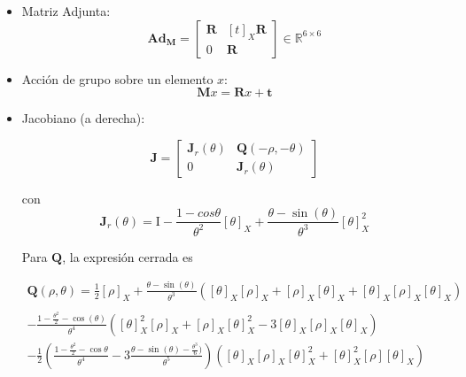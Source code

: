 \begin{itemize}
Mapa logarítmico:

$$
\tau = \text{Log}(\text{M}) \coloneq
\begin{bmatrix}
    \text{V}^{-1} (\theta) t \\
    \text{Log}(\text{R})
\end{bmatrix}
$$

con

$$
\text{V}(\theta) = \text{I} + \frac{1-cos\theta}{\theta} [\theta]_X
+
\frac{\theta - \sin(\theta)}{\theta} [\theta]^2_X
$$



\item 
Matriz Adjunta:
$$
\textbf{Ad}_\mathbf{M} =
\begin{bmatrix}
    \mathbf{R} & [t]_X \mathbf{R} \\
    0 & \mathbf{R}
\end{bmatrix}
\in \mathbb{R}^{6 \times 6}
$$

\item 
Acción de grupo sobre un elemento $x$:
$$
\mathbf{M}x = \mathbf{R}x + \mathbf{t} 
$$

\item 
Jacobiano (a derecha):

$$
\mathbf{J} = 
\begin{bmatrix}
    \mathbf{J}_r (\theta) & \mathbf{Q}(-\rho, -\theta) \\
    0 & \mathbf{J}_r (\theta)
\end{bmatrix}
$$

con 
$$
\mathbf{J}_r(\theta) = \text{I} - \frac{1-cos\theta}{\theta^2} [\theta]_X
+
\frac{\theta - \sin(\theta)}{\theta^3} [\theta]^2_X
$$

Para $\mathbf{Q}$, la expresión cerrada es

\begin{equation}
\begin{split}
\mathbf{Q}(\rho, \theta) = \frac{1}{2}[\rho]_X + \frac{\theta - \sin(\theta)}{\theta^3} ([\theta]_X [\rho]_X + [\rho]_X [\theta]_X + [\theta]_X [\rho]_X [\theta]_X) \\\\
- \frac{1 - \frac{\theta^2}{2}- \cos(\theta)}{\theta^4} ([\theta]_X^2 [\rho]_X + [\rho]_X [\theta]_X^2 - 3 [\theta]_X [\rho]_X [\theta]_X) \\
- \frac{1}{2}(\frac{1 - \frac{\theta^2}{2} - \cos{\theta}}{\theta^4} - 3 \frac{\theta - \sin(\theta) - \frac{\theta^3}{6})}{\theta^5}) ([\theta]_X [\rho]_X [\theta]_X^2 + [\theta]_X^2 [\rho] [\theta]_X)
\end{split}
\end{equation}

\end{itemize}



